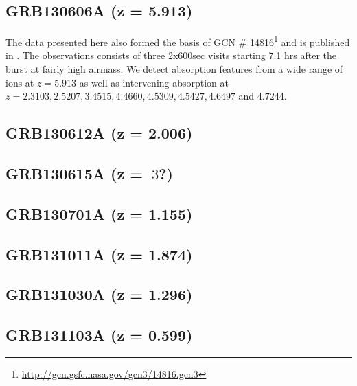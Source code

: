 \documentclass{aa}    %
\begin{document}
\subsection{GRB130606A (z = 5.913)}
The data presented here also formed the basis of GCN \#
14816\footnote{\url{http://gcn.gsfc.nasa.gov/gcn3/14816.gcn3}} and is published
in \citet{Hartoog2015}. The observations consists of three 2x600sec visits
starting 7.1 hrs after the burst at fairly high airmass. We detect absorption
features from a wide range of ions at $z=5.913$ as well as intervening
absorption at $z=2.3103, 2.5207, 3.4515, 4.4660, 4.5309, 4.5427, 4.6497 $ and $
4.7244$.




\subsection{GRB130612A (z = 2.006)}	





\subsection{GRB130615A (z = $~3$?)}	





\subsection{GRB130701A (z = 1.155)}	





\subsection{GRB131011A (z = 1.874)}	





\subsection{GRB131030A (z = 1.296)}	





\subsection{GRB131103A (z = 0.599)}	
\end{document}
